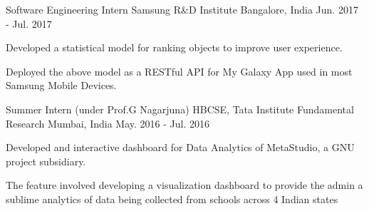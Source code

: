 \begin{cventries}
  \cventry
    {Software Engineering Intern} %
    {Samsung R\&D Institute} %
    {Bangalore, India} %
    {Jun. 2017 - Jul. 2017} %
    {
      \begin{cvitems} %
        \item {Developed a statistical model for ranking objects to improve user experience.}
        \item {Deployed the above model as a RESTful API for My Galaxy App used in most Samsung Mobile Devices.}
      \end{cvitems}
    }



  \cventry
    {Summer Intern (under Prof.G Nagarjuna)} %
    {HBCSE, Tata Institute Fundamental Research} %
    {Mumbai, India} %
    {May. 2016 - Jul. 2016} %
    {
      \begin{cvitems} %
        \item {Developed and interactive dashboard for Data Analytics of MetaStudio, a GNU project subsidiary.}
        \item {The feature involved developing a visualization dashboard to provide the admin a sublime analytics of data being collected from schools across 4 Indian states}
      \end{cvitems}
    }
\end{cventries}

